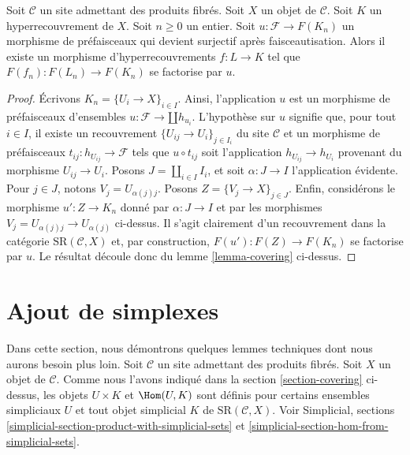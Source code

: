 \begin{lemma}
\label{lemma-covering-sheaf}
Soit $\mathcal{C}$ un site admettant des produits fibrés.
Soit $X$ un objet de $\mathcal{C}$.
Soit $K$ un hyperrecouvrement de $X$.
Soit $n \geq 0$ un entier.
Soit $u : \mathcal{F} \to F(K_n)$ un morphisme
de préfaisceaux qui devient surjectif
après faisceautisation.
Alors il existe un morphisme d'hyperrecouvrements
$f: L \to K$ tel que $F(f_n) : F(L_n) \to F(K_n)$
se factorise par $u$.
\end{lemma}

\begin{proof}
Écrivons $K_n = \{U_i \to X\}_{i \in I}$.
Ainsi, l'application $u$ est un morphisme de préfaisceaux d'ensembles
$u : \mathcal{F} \to \amalg h_{u_i}$.
L'hypothèse sur $u$ signifie que, pour tout
$i \in I$, il existe un recouvrement $\{U_{ij} \to U_i\}_{j \in I_i}$
du site $\mathcal{C}$ et un morphisme de préfaisceaux
$t_{ij} : h_{U_{ij}} \to \mathcal{F}$ tels que
$u \circ t_{ij}$ soit l'application $h_{U_{ij}} \to h_{U_i}$
provenant du morphisme $U_{ij} \to U_i$.
Posons $J = \amalg_{i \in I} I_i$, et soit
$\alpha : J \to I$ l'application évidente.
Pour $j \in J$, notons $V_j = U_{\alpha(j)j}$. Posons
$Z = \{V_j \to X\}_{j \in J}$.
Enfin, considérons le morphisme
$u' : Z \to K_n$ donné par $\alpha : J \to I$
et par les morphismes $V_j = U_{\alpha(j)j} \to U_{\alpha(j)}$
ci-dessus. Il s'agit clairement d'un recouvrement dans la
catégorie $\text{SR}(\mathcal{C}, X)$ et, par
construction, $F(u') : F(Z) \to F(K_n)$ se factorise par $u$.
Le résultat découle donc du lemme \ref{lemma-covering} ci-dessus.
\end{proof}


\section{Ajout de simplexes}
\label{section-adding-simplices}

\noindent
Dans cette section, nous démontrons quelques lemmes techniques dont nous aurons besoin plus loin.
Soit $\mathcal{C}$ un site admettant des produits fibrés.
Soit $X$ un objet de $\mathcal{C}$.
Comme nous l'avons indiqué dans la section \ref{section-covering} ci-dessus,
les objets $U \times K$ et $\Hom(U, K)$
sont définis pour certains ensembles simpliciaux $U$
et tout objet simplicial $K$ de $\text{SR}(\mathcal{C}, X)$.
Voir Simplicial, sections
\ref{simplicial-section-product-with-simplicial-sets} et
\ref{simplicial-section-hom-from-simplicial-sets}.


